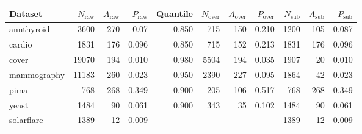 \begin{tabular}{l|rrr|rrrr|rrr}
  \toprule
Dataset & $N_{\text{raw}}$ & $A_{\text{raw}}$ & $P_{\text{raw}}$ & Quantile & $N_{\text{over}}$ & $A_{\text{over}}$ & $P_{\text{over}}$ & $N_{\text{sub}}$ & $A_{\text{sub}}$ & $P_{\text{sub}}$ \\ 
  \midrule
annthyroid & 3600 &  270 & 0.07 & 0.850 &  715 &  150 & 0.210 & 1200 &  105 & 0.087 \\ 
  cardio & 1831 &  176 & 0.096 & 0.850 &  715 &  152 & 0.213 & 1831 &  176 & 0.096 \\ 
  cover & 19070 &  194 & 0.010 & 0.980 & 5504 &  194 & 0.035 & 1907 &   20 & 0.010 \\ 
  mammography & 11183 &  260 & 0.023 & 0.950 & 2390 &  227 & 0.095 & 1864 &   42 & 0.023 \\ 
  pima &  768 &  268 & 0.349 & 0.900 &  205 &  106 & 0.517 &  768 &  268 & 0.349 \\ 
  yeast & 1484 &   90 & 0.061 & 0.900 &  343 &   35 & 0.102 & 1484 &   90 & 0.061 \\ 
  solarflare & 1389 &   12 & 0.009 &  &  &  &  & 1389 &   12 & 0.009 \\ 
   \bottomrule
\end{tabular}
